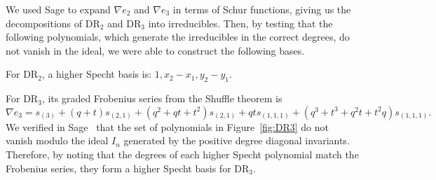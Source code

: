 \documentclass[ALCO,Unicode]{cedram}
\newcommand{\DR}{\mathrm{DR}}
\begin{document}
We used Sage to expand $\nabla e_2$ and $\nabla e_3$ in terms of Schur functions, giving us the decompositions of $\DR_2$ and $\DR_3$ into irreducibles.  Then, by testing that the following polynomials, which generate the irreducibles in the correct degrees, do not vanish in the ideal, we were able to construct the following bases.

\begin{example}
	For $\DR_2$, a higher Specht basis is: $1, x_2-x_1, y_2-y_1$.
\end{example}

\begin{example}
	For $\DR_3$, its graded Frobenius series from the Shuffle theorem is $$\nabla e_3 = s_{(3)}+(q+t)s_{(2,1)}+(q^2+qt+t^2)s_{(2,1)}+qt s_{(1,1,1)}+(q^3+t^3+q^2t+t^2q)s_{(1,1,1)}.$$  We verified in Sage~\cite{sage} that the set of polynomials in Figure~\ref{fig:DR3} do not vanish modulo the ideal $I_n$ generated by the positive degree diagonal invariants.  Therefore, by noting that the degrees of each higher Specht polynomial match the Frobenius series, they form a higher Specht basis for $\DR_3$.
\end{example}




\end{document}
